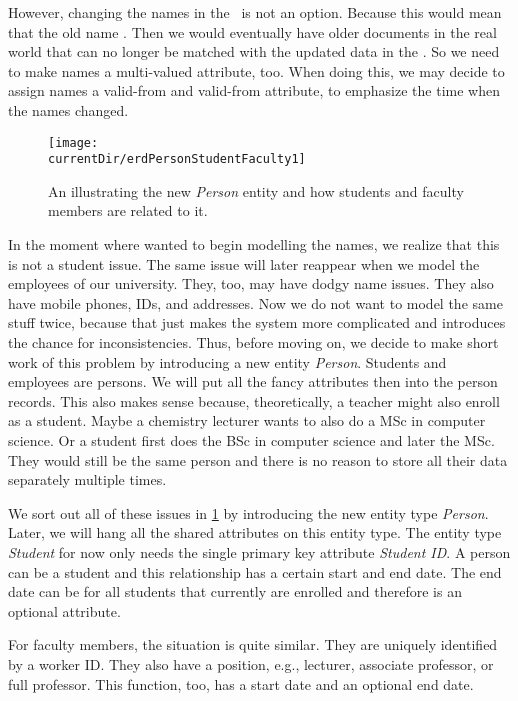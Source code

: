 However, changing the names in the \db\ is not an option.
Because this would mean that the old name .
Then we would eventually have older documents in the real world that can no longer be matched with the updated data in the \db.
So we need to make names a multi-valued attribute, too.
When doing this, we may decide to assign names a valid-from and valid-from attribute, to emphasize the time when the names changed.

\begin{figure}%
\centering%
\texttt{[image: \\currentDir/erdPersonStudentFaculty1]}%
\caption{An  illustrating the new \emph{Person} entity and how students and faculty members are related to it.}%
\label{fig:erdPersonStudentFaculty1}%
\end{figure}%

In the moment where wanted to begin modelling the names, we realize that this is not a student issue.
The same issue will later reappear when we model the employees of our university.
They, too, may have dodgy name issues.
They also have mobile phones, IDs, and addresses.
Now we do not want to model the same stuff twice, because that just makes the system more complicated and introduces the chance for inconsistencies.
Thus, before moving on, we decide to make short work of this problem by introducing a new entity \emph{Person}.
Students and employees are persons.
We will put all the fancy attributes then into the person records.
This also makes sense because, theoretically, a teacher might also enroll as a student.
Maybe a chemistry lecturer wants to also do a MSc in computer science.
Or a student first does the BSc in computer science and later the MSc.
They would still be the same person and there is no reason to store all their data separately multiple times.%

We sort out all of these issues in \cref{fig:erdPersonStudentFaculty1} by introducing the new entity type \emph{Person}.
Later, we will hang all the shared attributes on this entity type.
The entity type \emph{Student} for now only needs the single primary key attribute \emph{Student ID}.
A person can be a student and this relationship has a certain start and end date.
The end date can be  for all students that currently are enrolled and therefore is an optional attribute.

For faculty members, the situation is quite similar.
They are uniquely identified by a worker ID.
They also have a position, e.g., lecturer, associate professor, or full professor.
This function, too, has a start date and an optional end date.

